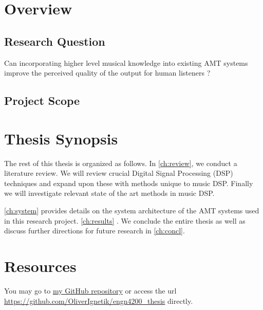 \section{Overview}

\subsection{Research Question}

Can incorporating higher level musical knowledge into existing AMT systems
improve the perceived quality of the output for human listeners ?

\subsection{Project Scope}

\lipsum[1]

\section{Thesis Synopsis}

The rest of this thesis is organized as follows. In \autoref{ch:review}, we
conduct a literature review. We will review crucial Digital Signal Processing
(DSP) techniques and expand upon these with methods unique to music DSP. Finally
we will investigate relevant state of the art methods in music DSP.

\autoref{ch:system} provides details on the system architecture of the AMT
systems used in this research project. \autoref{ch:results} . We conclude the
entire thesis as well as discuss further directions for future research in
\autoref{ch:concl}.

\section{Resources}

You may go to \href{https://github.com/OliverIgnetik/engn4200_thesis}{my GitHub
    repository} or access the url
\url{https://github.com/OliverIgnetik/engn4200_thesis} directly.
